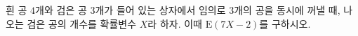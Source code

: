 흰 공 $4$개와 검은 공 $3$개가 들어 있는 상자에서 임의로 $3$개의 공을 동시에 꺼낼 때, 나오는 검은 공의 개수를 확률변수 $X$라 하자. 이때 $\mathrm{E}(7X-2)$를 구하시오.
